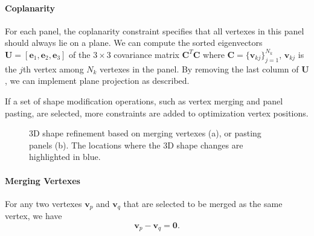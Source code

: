 \paragraph{Coplanarity} {For each panel, the coplanarity constraint specifies that all vertexes in this panel should always lie on a plane. 
We can compute the sorted eigenvectors $\mathbf{U} = [\mathbf{e}_1, \mathbf{e}_2, \mathbf{e}_3]$ of the $ 3 \times 3$ covariance matrix $\mathbf{C}^T\mathbf{C}$ where $\mathbf{C} = \{\mathbf{v}_{kj}\}_{j=1}^{N_k}$, $\mathbf{v}_{kj}$ is the $j$th vertex among $N_k$ vertexes in the panel. By removing the last column of $\mathbf{U}$, we can implement plane projection as \cite{Bouaziz:2012:SSD:2346796.2346802} described.


If a set of shape modification operations, such as vertex merging and panel pasting, are selected, more constraints are added to optimization vertex positions. 
%

\begin{figure}
	\centering
	\caption{3D shape refinement based on merging vertexes (a), or pasting panels (b). The locations where the 3D shape changes are highlighted in blue.  }
	\label{fig:shaperefinement}
\end{figure}

\paragraph{Merging Vertexes} 
For any two vertexes $\mathbf{v}_p$ and $\mathbf{v}_q$ that are selected to be merged as the same vertex, we have 
\begin{equation}
\mathbf{v}_p - \mathbf{v}_q = \mathbf{0}.
\label{equ:point}
\end{equation}

}
